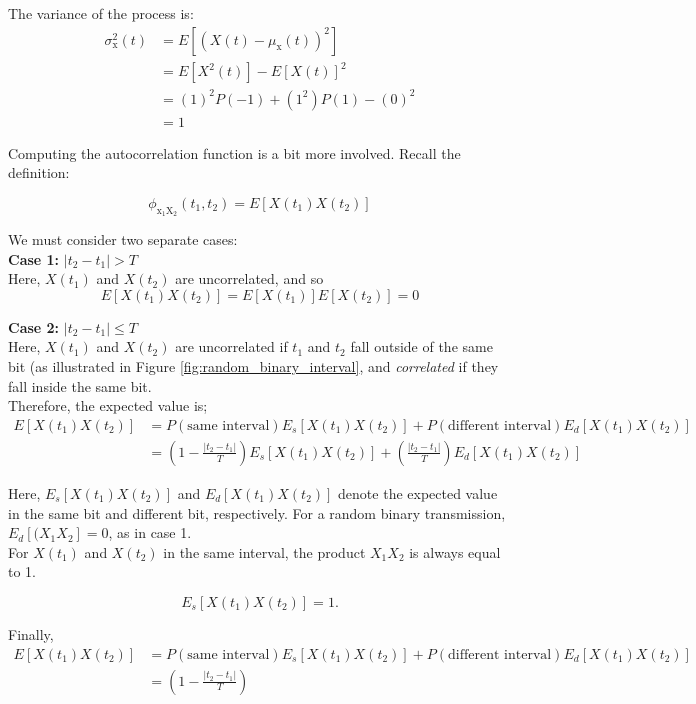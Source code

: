\documentclass[12pt]{book}
\theoremstyle{definition}
\begin{document}
The variance of the process is:
\[
\begin{split}
    \sigma_\mathrm{x}^2(t) & = E \left [ (X(t)-\mu_\mathrm{x}(t))^2 \right ]\\
            & = E \left [ X^2(t) \right ] - E\left [ X(t) \right ]^2 \\
            & = (1)^2P(-1) + (1^2)P(1) - (0)^2 \\
            & = 1
\end{split}
\]

Computing the autocorrelation function is a bit more involved. Recall the definition:

\[
    \phi_\mathrm{x_1 X_2}(t_1,t_2) = E\left [ X(t_1) X(t_2) \right ]
\]

We must consider two separate cases:\\

\textbf{Case 1:} \( |t_2-t_1|>T\)\\
Here, \(X(t_1)\) and \(X(t_2)\) are uncorrelated, and so
\[
E\left [ X(t_1) X(t_2) \right ] = E\left [ X(t_1) \right ] E\left [X(t_2)\right ] = 0
\]

\textbf{Case 2:} \( |t_2-t_1|\le T\)\\
Here, \(X(t_1)\) and \(X(t_2)\) are uncorrelated if \(t_1\) and \(t_2\) fall outside of the same bit (as illustrated in Figure \ref{fig:random_binary_interval}, and \emph{correlated} if they fall inside the same bit.\\

Therefore, the expected value is;
\[
\begin{split}
    E\left [ X(t_1) X(t_2) \right ] & = P(\text{same interval})E_s[X(t_1) X(t_2)] + P(\text{different interval})E_d[X(t_1) X(t_2)]\\
        & = \left ( 1-\frac{|t_2-t_1|}{T} \right)E_s[X(t_1) X(t_2)] + \left (\frac{|t_2-t_1|}{T} \right)E_d[X(t_1) X(t_2)]
\end{split}
\]

Here, \(E_s[X(t_1) X(t_2)]\) and \(E_d[X(t_1) X(t_2)]\) denote the expected value in the same bit and different bit, respectively. For a random binary transmission, \(E_d[(X_1 X_2]=0\), as in case 1.\\

For \(X(t_1)\) and \(X(t_2)\) in the same interval, the product \(X_1 X_2\) is always equal to 1.
 
\[ 
E_s[X(t_1) X(t_2)] = 1.
\]

Finally, 
\[
\begin{split}
    E\left [ X(t_1) X(t_2) \right ] & = P(\text{same interval})E_s[X(t_1) X(t_2)] + P(\text{different interval})E_d[X(t_1) X(t_2)]\\
        & = \left( 1-\frac{|t_2-t_1|}{T} \right )
\end{split}
\]
\end{document}
